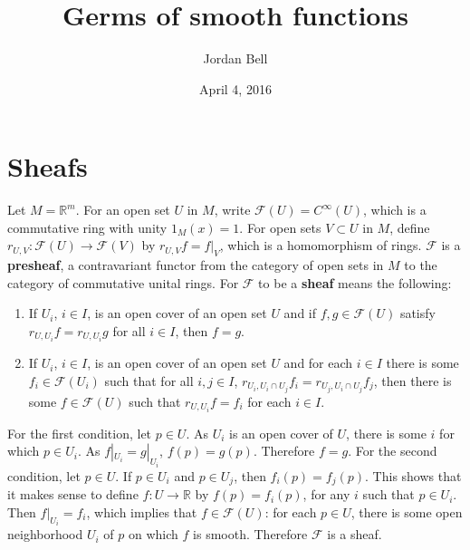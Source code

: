 \documentclass{article}
\theoremstyle{definition}
\begin{document}
\title{Germs of smooth functions}
\author{Jordan Bell}
\date{April 4, 2016}

\maketitle

\section{Sheafs}
Let $M=\mathbb{R}^m$. 
For an open set $U$ in $M$, write $\mathcal{F}(U) = C^\infty(U)$, which is a commutative ring with unity $1_M(x)=1$. 
For open sets $V \subset U$ in $M$, define $r_{U,V}:\mathcal{F}(U) \to \mathcal{F}(V)$ by
$r_{U,V} f = f|_V$, which is a homomorphism of rings. 
$\mathcal{F}$ is a \textbf{presheaf}, a contravariant functor from the category of
open  sets in $M$ to the category of commutative unital rings. For $\mathcal{F}$ to be a \textbf{sheaf} means
the following:
\begin{enumerate}
\item If $U_i$, $i \in I$, is an open cover of an open set $U$ and if $f,g \in \mathcal{F}(U)$ satisfy
$r_{U,U_i} f = r_{U,U_i} g$ for all $i \in I$, then $f=g$.
\item If $U_i$, $i \in I$, is an open cover of an open set $U$ and for each $i \in I$ there is some $f_i \in \mathcal{F}(U_i)$ such that
for all $i,j \in I$, $r_{U_i, U_i \cap U_j} f_i = r_{U_j, U_i \cap U_j} f_j$, then there is some $f \in \mathcal{F}(U)$ such that 
$r_{U,U_i} f = f_i$ for each $i \in I$.
\end{enumerate}
For the first condition, let $p \in U$. As $U_i$ is an open cover of $U$, there is some $i$ for which $p \in U_i$. 
As $f|_{U_i} = g|_{U_i}$, $f(p)=g(p)$. Therefore $f=g$. For the second condition, 
let $p \in U$. If $p \in U_i$ and $p \in U_j$, then $f_i(p) = f_j(p)$. This shows that it makes
sense to define $f:U \to \mathbb{R}$ by $f(p)=f_i(p)$, for any $i$ such that $p \in U_i$. 
Then $f|_{U_i} = f_i$, which implies that $f \in \mathcal{F}(U)$: for each $p \in U$, there is some
open neighborhood $U_i$ of $p$ on which $f$ is smooth. Therefore
$\mathcal{F}$ is a sheaf.
\end{document}
